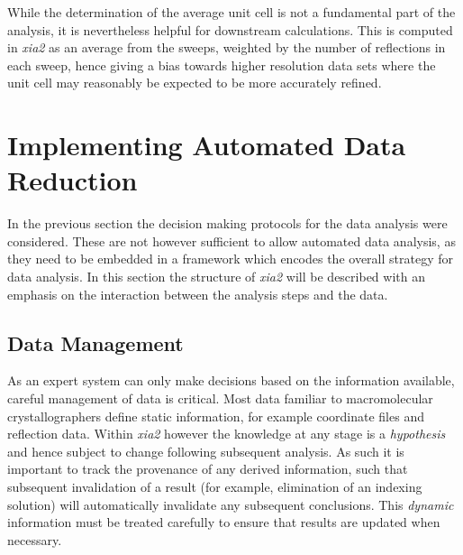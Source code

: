 \documentclass[preprint,pdf]{iucr}
\begin{document}
While the determination of the average unit cell is not a fundamental
part of the analysis, it is nevertheless helpful for downstream
calculations. This is computed in \emph{xia2} as an average from the
sweeps, weighted by the number of reflections in each sweep, hence
giving a bias towards higher resolution data sets where the unit cell
may reasonably be expected to be more accurately refined.

\section{Implementing Automated Data Reduction}

In the previous section the decision making protocols for the data
analysis were considered. These are not however sufficient to allow
automated data analysis, as they need to be embedded in a framework
which encodes the overall strategy for data analysis. In this section
the structure of \emph{xia2} will be described with an emphasis on the
interaction between the analysis steps and the data.

\subsection{Data Management}

As an expert system can only make decisions based on the information
available, careful management of data is critical. Most data familiar
to macromolecular crystallographers define static
information, for example coordinate files and reflection data. 
Within \emph{xia2} however
the knowledge at any stage is a \emph{hypothesis} and hence
subject to change following subsequent analysis. As such it is
important to track the provenance of any derived information, such
that subsequent invalidation of a result (for example, elimination of
an indexing solution) will automatically invalidate any subsequent
conclusions. This \emph{dynamic} information must be treated carefully
to ensure that results are updated when necessary. 
\end{document}
